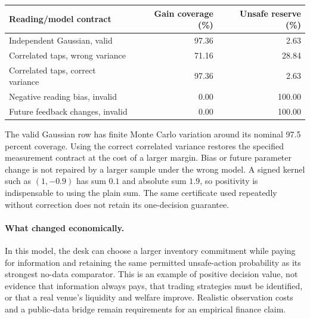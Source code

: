 \begin{center}\footnotesize\begin{tabular}{p{}rr}
\toprule
Reading/model contract & Gain coverage (\%) & Unsafe reserve (\%)\\
\midrule
Independent Gaussian, valid & 97.36 & 2.63\\
Correlated taps, wrong variance & 71.16 & 28.84\\
Correlated taps, correct variance & 97.36 & 2.63\\
Negative reading bias, invalid & 0.00 & 100.00\\
Future feedback changes, invalid & 0.00 & 100.00\\
\bottomrule\end{tabular}\end{center}
The valid Gaussian row has finite Monte Carlo variation around its nominal
97.5 percent coverage. Using the correct correlated variance restores the
specified measurement contract at the cost of a larger margin. Bias or
future parameter change is not repaired by a larger sample under the wrong
model. A signed kernel such as $(1,-0.9)$ has sum $0.1$ and absolute sum
$1.9$, so positivity is indispensable to using the plain sum. The same
certificate used repeatedly without correction does not retain its
one-decision guarantee.

\paragraph{What changed economically.}
In this model, the desk can choose a larger inventory commitment while
paying for information and retaining the same permitted unsafe-action
probability as its strongest no-data comparator. This is an example of
positive decision value, not evidence that information always pays, that
trading strategies must be identified, or that a real venue's liquidity and
welfare improve. Realistic observation costs and a public-data bridge remain
requirements for an empirical finance claim.



